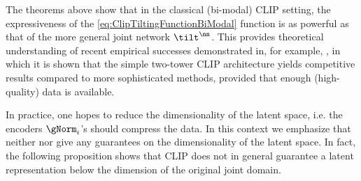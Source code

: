 \documentclass{article}
\begin{document}
The theorems above show that in the classical (bi-modal) CLIP setting, the
expressiveness of the \eqref{eq:ClipTiltingFunctionBiModal} function is as
powerful as that of the more general joint network $\tilt^\nn$. This
provides theoretical understanding of recent empirical successes
demonstrated in, for example, \citep{jiaScalingVisualVisionLanguage2021},
in which it is shown that the simple two-tower CLIP architecture yields
competitive results compared to more sophisticated methods, provided that
enough (high-quality) data is available.

In practice, one hopes to reduce the dimensionality of the latent space,
i.e. the encoders $\gNorm_i$'s should compress the data. In this context we
emphasize that neither  nor
 give any guarantees on
the dimensionality of the latent space. In fact, the following proposition
shows that CLIP does not in general guarantee a latent representation below
the dimension of the original joint domain.
\end{document}

